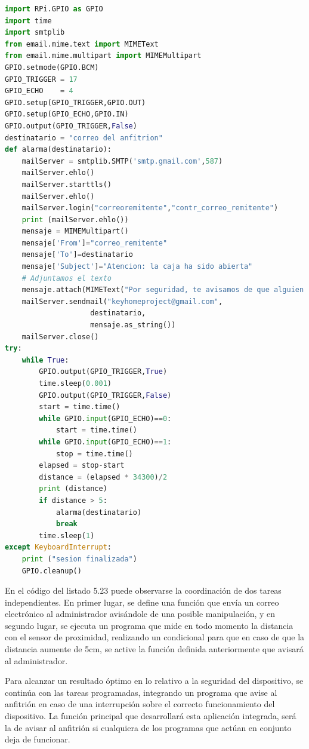 \begin{lstlisting}[language=Python,
    caption={Alarma ante posibles manipulaciones},
    label=src:alarma-ante-posibles-manipulaciones
]
import RPi.GPIO as GPIO
import time
import smtplib
from email.mime.text import MIMEText
from email.mime.multipart import MIMEMultipart
GPIO.setmode(GPIO.BCM)
GPIO_TRIGGER = 17        
GPIO_ECHO    = 4      
GPIO.setup(GPIO_TRIGGER,GPIO.OUT) 
GPIO.setup(GPIO_ECHO,GPIO.IN)  
GPIO.output(GPIO_TRIGGER,False) 
destinatario = "correo del anfitrion"
def alarma(destinatario):   
    mailServer = smtplib.SMTP('smtp.gmail.com',587)
    mailServer.ehlo()
    mailServer.starttls()
    mailServer.ehlo()
    mailServer.login("correoremitente","contr_correo_remitente")
    print (mailServer.ehlo())
    mensaje = MIMEMultipart()
    mensaje['From']="correo_remitente"
    mensaje['To']=destinatario
    mensaje['Subject']="Atencion: la caja ha sido abierta"
    # Adjuntamos el texto
    mensaje.attach(MIMEText("Por seguridad, te avisamos de que alguien ha abierto la caja de tu dispositivo Keyhome."))
    mailServer.sendmail("keyhomeproject@gmail.com",
                    destinatario,
                    mensaje.as_string())
    mailServer.close()
try:
    while True:
        GPIO.output(GPIO_TRIGGER,True)
        time.sleep(0.001)
        GPIO.output(GPIO_TRIGGER,False)
        start = time.time()  
        while GPIO.input(GPIO_ECHO)==0:
            start = time.time() 
        while GPIO.input(GPIO_ECHO)==1: 
            stop = time.time()       
        elapsed = stop-start     
        distance = (elapsed * 34300)/2  
        print (distance)  
        if distance > 5:
            alarma(destinatario)
            break
        time.sleep(1)
except KeyboardInterrupt:
    print ("sesion finalizada")
    GPIO.cleanup()
\end{lstlisting}

En el código del listado 5.23 puede observarse la coordinación de dos tareas independientes. En primer lugar, se define una función que envía un correo electrónico al administrador avisándole de una posible manipulación, y en segundo lugar, se ejecuta un programa que mide en todo momento la distancia con el sensor de proximidad, realizando un condicional para que en caso de que la distancia aumente de 5cm, se active la función definida anteriormente que avisará al administrador.

Para alcanzar un resultado óptimo en lo relativo a la seguridad del dispositivo, se continúa con las tareas programadas, integrando un programa que avise al anfitrión en caso de una interrupción sobre el correcto funcionamiento del dispositivo. La función principal que desarrollará esta aplicación integrada, será la de avisar al anfitrión si cualquiera de los programas que actúan en conjunto deja de funcionar.

